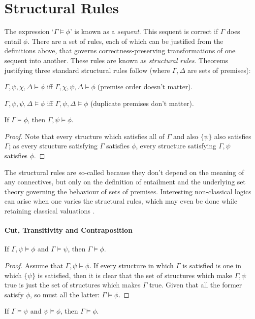 \section{Structural Rules}\label{twostruct}

The expression ‘$\Gamma \vDash \phi$’ is known as a \emph{sequent}. This sequent is correct if $\Gamma$ does entail $\phi$. There are a set of rules, each of which can be justified from the definitions above, that governs correctness-preserving transformations of one sequent into another. These rules are known as \emph{structural rules}. Theorems justifying three standard structural rules follow (where $\Gamma, \Delta$ are sets of premises): \begin{theorem}[Permutation] $\Gamma, \psi,\chi,\Delta \vDash \phi$ iff $\Gamma, \chi,\psi,\Delta \vDash \phi$ (premise order doesn't matter).\end{theorem}
\begin{theorem}[Contraction]$\Gamma, \psi,\psi, \Delta \vDash \phi$ iff $\Gamma, \psi,\Delta \vDash \phi$ (duplicate premises don't matter).
\end{theorem}
\begin{theorem}
	[Weakening] If $\Gamma \vDash \phi$, then $\Gamma, \psi \vDash	\phi$.
	\begin{proof}
		Note that every structure which satisfies all of $\Gamma$ and also $\{\psi\}$ also satisfies $\Gamma$; as every structure satisfying $\Gamma$ satisfies $\phi$, every structure satisfying $\Gamma, \psi$ satisfies $\phi$.
	\end{proof}
\end{theorem}
The structural rules are so-called because they don't depend on the meaning of any connectives, but only on the definition of entailment and the underlying set theory governing the behaviour of sets of premises. Interesting non-classical logics can arise when one varies the structural rules, which may even be done while retaining classical valuations \citep{restsub}. 

\paragraph{Cut, Transitivity and Contraposition}

\begin{theorem}[Cut] If $\Gamma, \psi \vDash \phi$ and $\Gamma \vDash \psi$, then $\Gamma \vDash \phi$. \begin{proof}
	Assume that $\Gamma, \psi \vDash \phi$. If every structure in which $\Gamma$ is satisfied is one in which $\{\psi\}$ is satisfied, then it is clear that the set of structures
	which make $\Gamma, \psi$ true is just the set of structures which makes 
	$\Gamma$ true. Given that all the former satisfy $\phi$, so must all the latter: $\Gamma \vDash \phi$.
\end{proof}
\end{theorem}
\begin{theorem}[Transitivity]
	If $\Gamma \vDash \psi$ and $\psi \vDash \phi$, then $\Gamma \vDash \phi$.
\end{theorem}


